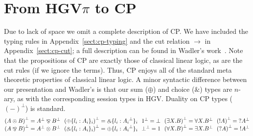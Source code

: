 \documentclass{easychair}
\makeatletter
\newcommand{\ba}{\begin{array}}
\newcommand{\ea}{\end{array}}
\newcommand{\bl}{\ba{@{}c@{}}}
\newcommand{\el}{\ea}
\newenvironment{equations}{\[\ba{@{}r@{~}c@{~}l@{}}}{\ea\]}
\newcommand{\set}[1]{\{ #1 \}}
\newcommand{\row}[2]{\set{#1}_{#2}}
\newcommand{\gvj}[3]{{#1} \vdash {#2} : {#3}}
\newcommand{\la}{l}
\newcommand{\cpTimes}[2]{{#1} \otimes {#2}}
\newcommand{\cpPar}[2]{{#1} \mathbin{\bindnasrepma} {#2}}
\newcommand{\cpPlus}[2]{\oplus \row{#1}{#2}}
\newcommand{\cpWith}[2]{\binampersand \row{#1}{#2}}
\newcommand{\cpOne}{1}
\newcommand{\cpBottom}{\bot}
\newcommand{\cpOfCourse}[1]{\mathord{!}{#1}}
\newcommand{\cpWhyNot}[1]{\mathord{?}{#1}}
\newcommand{\cpDual}[1]{{#1}^\bot}
\newcommand{\cpExists}[2]{\exists {#1}.{#2}}
\newcommand{\cpForall}[2]{\forall {#1}.{#2}}
\newcommand{\hgv}{HGV\xspace}
\newcommand{\hgvpi}{HGV$\pi$\xspace}
\newcommand{\lampi}[1]{({#1})^\star}
\newcommand{\redto}{\longrightarrow}
\makeatother
\begin{document}



\section{From \hgvpi to CP}

Due to lack of space we omit a complete description of CP. We have included the typing rules in
Appendix~\ref{sect:cp-typing} and the cut relation $\redto$ in Appendix~\ref{sect:cp-cut}; a full
description can be found in Wadler's work~\cite{Wadler12}. Note that the propositions of CP are
exactly those of classical linear logic, as are the cut rules (if we ignore the terms). Thus, CP
enjoys all of the standard meta theoretic properties of classical linear logic.
%
A minor syntactic difference between our presentation and Wadler's is that our sum ($\oplus$) and
choice ($\binampersand$) types are $n$-ary, as with the corresponding session types in \hgv.
%
Duality on CP types ($\cpDual{(-)}$) is standard.
\[
\bl
  \cpDual{(\cpTimes{A}{B})} = \cpPar{\cpDual{A}}{\cpDual{B}}
~~
  \cpDual{(\cpPlus{\la_i:A_i}{i})} = \cpWith{\la_i:\cpDual{A_i}}{i}
~~
  \cpDual{\cpOne} = \cpBottom
~~
  \cpDual{(\cpExists{X}{B})} = \cpForall{X}{\cpDual{B}}
~~
  \cpDual{(\cpOfCourse{A})} = \cpWhyNot{\cpDual{A}}
\\
  \cpDual{(\cpPar{A}{B})} = \cpTimes{\cpDual{A}}{\cpDual{B}}
~~
  \cpDual{(\cpWith{\la_i:A_i}{i})} = \cpPlus{\la_i:\cpDual{A_i}}{i}
~~
  \cpDual{\cpBottom} = \cpOne
~~
  \cpDual{(\cpForall{X}{B})} = \cpExists{X}{\cpDual{B}}
~~
  \cpDual{(\cpWhyNot{A})} = \cpOfCourse{\cpDual{A}}
\\
\el
\]
\end{document}
